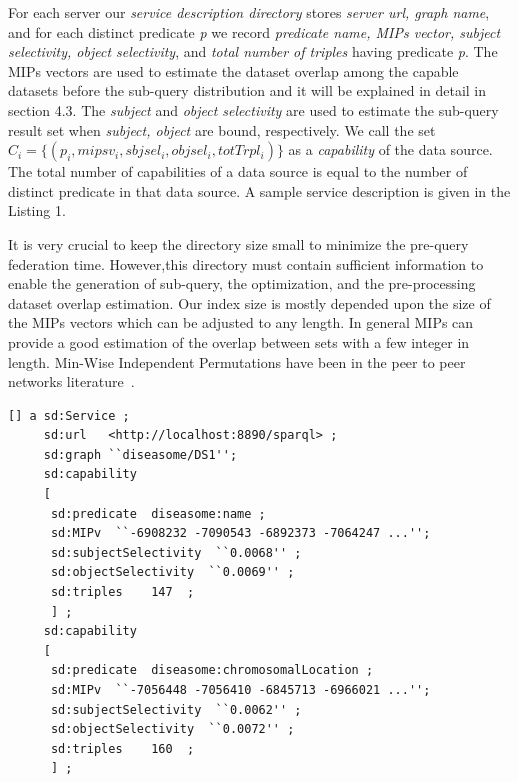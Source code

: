 \documentclass{sig-alternate}  %
\begin{document}
For each server our \emph{service description directory} stores \textit{server url, graph name}, and for
each distinct predicate \emph{p} we record \textit{predicate name,
MIPs vector, subject selectivity, object selectivity}, and \textit{total number of triples} having predicate
\emph{p}. The MIPs vectors are used to estimate the dataset overlap
among the capable datasets before the sub-query distribution and it will be explained in detail in section 4.3. The \emph{subject} and \emph{object selectivity} are used to estimate the sub-query result set when \emph{subject, object} are bound, respectively. We call the set \emph{$C_i = \{(p_i,mipsv_i,sbjsel_i,objsel_i,totTrpl_i)\}$} as a \emph{capability} of the data source. The total number of capabilities of a data source is equal to the number of distinct predicate in that data source. A sample service description is given in the Listing 1.

It is very crucial to keep the directory size small to minimize the pre-query federation time. However,this directory must contain sufficient information to enable the generation of sub-query, the optimization, and the pre-processing dataset overlap estimation. Our index size is mostly depended upon the size of the MIPs vectors which can be adjusted to any length. In general MIPs can provide a good estimation of the overlap between sets with a few integer in length. Min-Wise Independent Permutations have been in the peer to peer networks literature~\cite{key-13, key-39, key-40}.
\begin{lstlisting}[caption = {A Service Description Example},basicstyle={\tiny},float,frame={single},stringstyle={\ttfamily}]
[] a sd:Service ;
     sd:url   <http://localhost:8890/sparql> ;
     sd:graph ``diseasome/DS1'';
     sd:capability
     [
      sd:predicate  diseasome:name ;
      sd:MIPv  ``-6908232 -7090543 -6892373 -7064247 ...'';           
      sd:subjectSelectivity  ``0.0068'' ;
      sd:objectSelectivity  ``0.0069'' ;
      sd:triples    147  ;
      ] ;
     sd:capability
     [
      sd:predicate  diseasome:chromosomalLocation ;
      sd:MIPv  ``-7056448 -7056410 -6845713 -6966021 ...'';
      sd:subjectSelectivity  ``0.0062'' ;
      sd:objectSelectivity  ``0.0072'' ;
      sd:triples    160  ;
      ] ;
\end{lstlisting}
\end{document}
